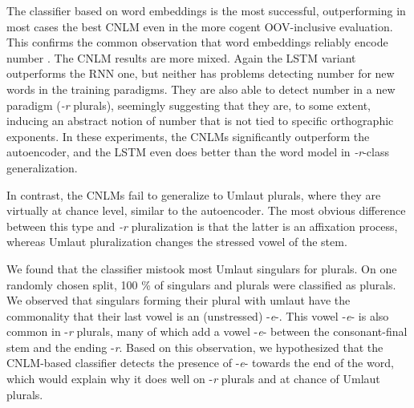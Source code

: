 



The classifier based on word embeddings is the most successful,
outperforming in most cases the best CNLM even in the more cogent
OOV-inclusive evaluation. This confirms the common observation that
word embeddings reliably encode number \cite{Mikolov:etal:2013a}. The
CNLM results are more mixed. Again the LSTM variant outperforms the
RNN one, but neither has problems detecting number for new words in
the training paradigms. They are also able to detect number in a new
paradigm (\emph{-r} plurals), seemingly suggesting that they are, to some extent,
inducing an abstract notion of number that is not tied to specific
orthographic exponents. In these experiments, the CNLMs significantly
outperform the autoencoder, and the LSTM even does better than the
word model in \emph{-r}-class generalization.

In contrast, the CNLMs fail to generalize to Umlaut plurals, where
they are virtually at chance level, similar to the autoencoder. %
The most obvious difference between this type and
\emph{-r} pluralization is that the latter is an affixation process,
whereas Umlaut pluralization changes the stressed vowel of the
stem.


We found that the classifier mistook most Umlaut singulars for plurals.
On one randomly chosen split, 100 \% of singulars and plurals were classified as plurals.
We observed that singulars forming their plural with umlaut have the commonality that their last vowel is an (unstressed) -\emph{e}-.
This vowel -\emph{e}- is also common in -\emph{r} plurals, many of which add a vowel -\emph{e}- between the consonant-final stem and the ending -\emph{r}.
Based on this observation, we hypothesized that the CNLM-based classifier detects the presence of -\emph{e}- towards the end of the word, which would explain why it does well on -\emph{r} plurals and at chance of Umlaut plurals.

